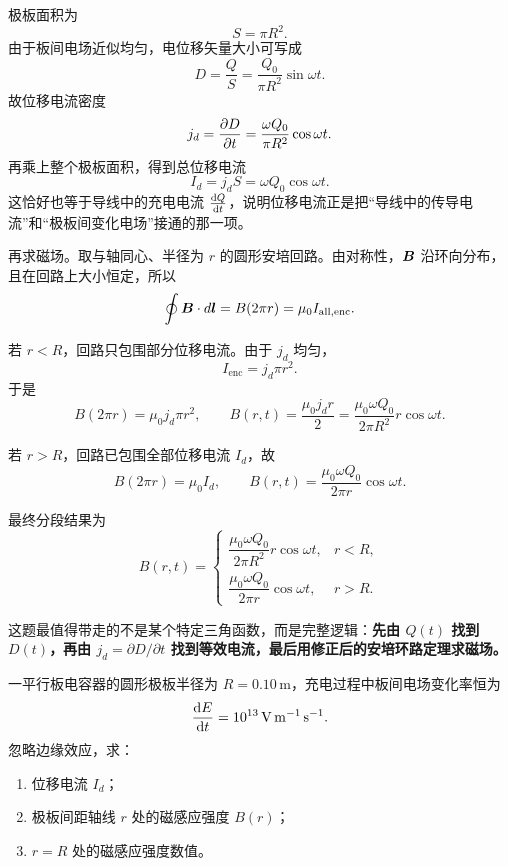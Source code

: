 \documentclass[lang=cn,11pt]{elegantbook}
\begin{document}
\begin{solution}
极板面积为
\[
S=\pi R^2.
\]
由于板间电场近似均匀，电位移矢量大小可写成
\[
D=\frac{Q}{S}
=\frac{Q_0}{\pi R^2}\sin\omega t.
\]
故位移电流密度
\[
j_d=\pdv{D}{t}
=\frac{\omega Q_0}{\pi R^2}\cos\omega t.
\]
再乘上整个极板面积，得到总位移电流
\[
I_d=j_dS=\omega Q_0\cos\omega t.
\]
这恰好也等于导线中的充电电流 \(\dv{Q}{t}\)，说明位移电流正是把“导线中的传导电流”和“极板间变化电场”接通的那一项。

再求磁场。取与轴同心、半径为 \(r\) 的圆形安培回路。由对称性，\(\vb*{B}\) 沿环向分布，且在回路上大小恒定，所以
\[
\oint \vb*{B}\cdot d\vb*{l}=B(2\pi r)=\mu_0 I_{\mathrm{all,enc}}.
\]

若 \(r<R\)，回路只包围部分位移电流。由于 \(j_d\) 均匀，
\[
I_{\mathrm{enc}}=j_d\pi r^2.
\]
于是
\[
B(2\pi r)=\mu_0j_d\pi r^2,
\qquad
B(r,t)=\frac{\mu_0j_dr}{2}
=\frac{\mu_0\omega Q_0}{2\pi R^2}r\cos\omega t.
\]

若 \(r>R\)，回路已包围全部位移电流 \(I_d\)，故
\[
B(2\pi r)=\mu_0I_d,
\qquad
B(r,t)=\frac{\mu_0\omega Q_0}{2\pi r}\cos\omega t.
\]

最终分段结果为
\[
B(r,t)=
\begin{cases}
\dfrac{\mu_0\omega Q_0}{2\pi R^2}r\cos\omega t, & r<R,\\[8pt]
\dfrac{\mu_0\omega Q_0}{2\pi r}\cos\omega t, & r>R.
\end{cases}
\]

这题最值得带走的不是某个特定三角函数，而是完整逻辑：\textbf{先由 \(Q(t)\) 找到 \(D(t)\)，再由 \(j_d=\partial D/\partial t\) 找到等效电流，最后用修正后的安培环路定理求磁场。}
\end{solution}

\begin{example}
一平行板电容器的圆形极板半径为 \(R=0.10\,\mathrm{m}\)，充电过程中板间电场变化率恒为
\[
\dv{E}{t}=10^{13}\,\mathrm{V\,m^{-1}\,s^{-1}}.
\]
忽略边缘效应，求：
\begin{enumerate}
  \item 位移电流 \(I_d\)；
  \item 极板间距轴线 \(r\) 处的磁感应强度 \(B(r)\)；
  \item \(r=R\) 处的磁感应强度数值。
\end{enumerate}
\end{example}
\end{document}

